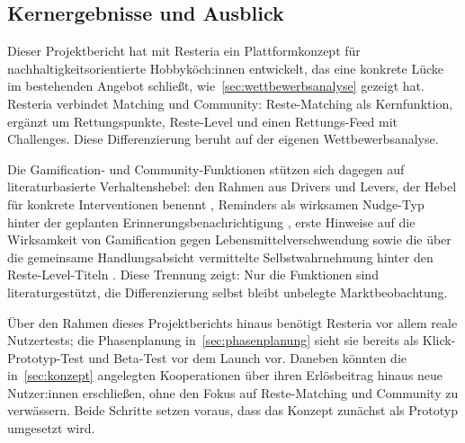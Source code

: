 \subsection{Kernergebnisse und Ausblick}\label{sec:kernergebnisse_und_ausblick}

Dieser Projektbericht hat mit Resteria ein Plattformkonzept für nachhaltigkeitsorientierte Hobbyköch:innen entwickelt, das eine konkrete Lücke im bestehenden Angebot schließt, wie~\autoref{sec:wettbewerbsanalyse} gezeigt hat. Resteria verbindet Matching und Community: Reste-Matching als Kernfunktion, ergänzt um Rettungspunkte, Reste-Level und einen Rettungs-Feed mit Challenges. Diese Differenzierung beruht auf der eigenen Wettbewerbsanalyse.

Die Gamification- und Community-Funktionen stützen sich dagegen auf literaturbasierte Verhaltenshebel: den Rahmen aus Drivers und Levers, der Hebel für konkrete Interventionen benennt \parencite[S. 105]{vittuariHowReduceConsumer2023}, Reminders als wirksamen Nudge-Typ hinter der geplanten Erinnerungsbenachrichtigung \parencite[S. 10]{barkerWhatNudgeTechniques2021}, erste Hinweise auf die Wirksamkeit von Gamification gegen Lebensmittelverschwendung \parencite[S. 9]{somaFoodWasteReduction2020} sowie die über die gemeinsame Handlungsabsicht vermittelte Selbstwahrnehmung hinter den Reste-Level-Titeln \parencite[S. 14]{nivedhithaHowGreenSocial2024}. Diese Trennung zeigt: Nur die Funktionen sind literaturgestützt, die Differenzierung selbst bleibt unbelegte Marktbeobachtung.

Über den Rahmen dieses Projektberichts hinaus benötigt Resteria vor allem reale Nutzertests; die Phasenplanung in~\autoref{sec:phasenplanung} sieht sie bereits als Klick-Prototyp-Test und Beta-Test vor dem Launch vor. Daneben könnten die in~\autoref{sec:konzept} angelegten Kooperationen über ihren Erlösbeitrag hinaus neue Nutzer:innen erschließen, ohne den Fokus auf Reste-Matching und Community zu verwässern. Beide Schritte setzen voraus, dass das Konzept zunächst als Prototyp umgesetzt wird.
